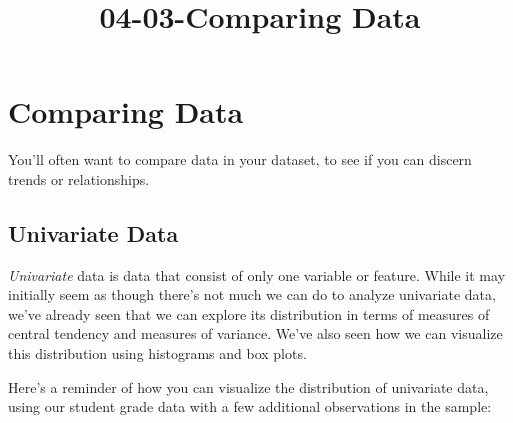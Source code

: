 \documentclass[11pt]{article}
\title{04-03-Comparing Data}
\begin{document}
    
    
    \maketitle
    
    

    
    \section{Comparing Data}\label{comparing-data}

You'll often want to compare data in your dataset, to see if you can
discern trends or relationships.

\subsection{Univariate Data}\label{univariate-data}

\emph{Univariate} data is data that consist of only one variable or
feature. While it may initially seem as though there's not much we can
do to analyze univariate data, we've already seen that we can explore
its distribution in terms of measures of central tendency and measures
of variance. We've also seen how we can visualize this distribution
using histograms and box plots.

Here's a reminder of how you can visualize the distribution of
univariate data, using our student grade data with a few additional
observations in the sample:
\end{document}
